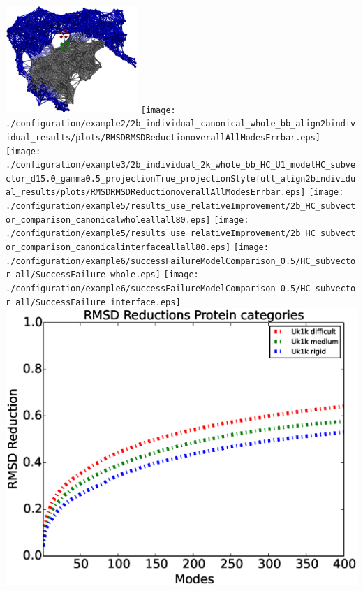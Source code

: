 \documentclass[11pt]{article}
\begin{document}
\includegraphics[width=5cm]{./pics/cnma.eps}
\clearpage%
\texttt{[image: ./configuration/example2/2b\_individual\_canonical\_whole\_bb\_align2bindividual\_results/plots/RMSDRMSDReductionoverallAllModesErrbar.eps]}
\clearpage%
\texttt{[image: ./configuration/example3/2b\_individual\_2k\_whole\_bb\_HC\_U1\_modelHC\_subvector\_d15.0\_gamma0.5\_projectionTrue\_projectionStylefull\_align2bindividual\_results/plots/RMSDRMSDReductionoverallAllModesErrbar.eps]}
\clearpage%
\texttt{[image: ./configuration/example5/results\_use\_relativeImprovement/2b\_HC\_subvector\_comparison\_canonicalwholeallall80.eps]}
\clearpage%
\texttt{[image: ./configuration/example5/results\_use\_relativeImprovement/2b\_HC\_subvector\_comparison\_canonicalinterfaceallall80.eps]}
\clearpage%
\texttt{[image: ./configuration/example6/successFailureModelComparison\_0.5/HC\_subvector\_all/SuccessFailure\_whole.eps]}
\clearpage%
\texttt{[image: ./configuration/example6/successFailureModelComparison\_0.5/HC\_subvector\_all/SuccessFailure\_interface.eps]}
\clearpage%
\includegraphics[width=\textwidth]{./postanalysis/pics/2b_individual_canonical_whole_bb_align2bindividual_results/plots/RMSDReductionAssessmentWholeProtein.eps}
\end{document}
